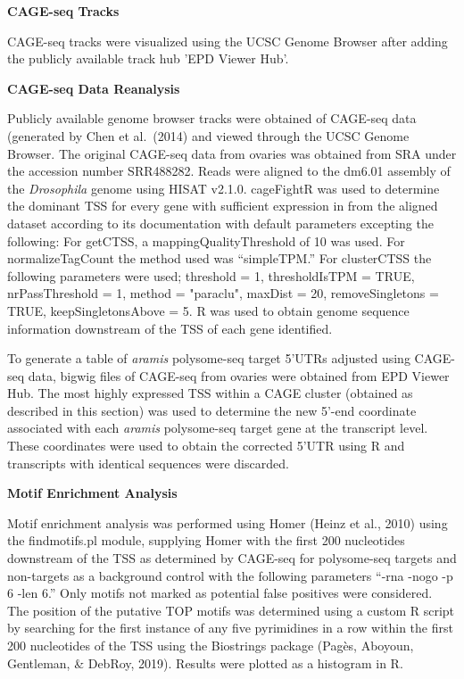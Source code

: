 \documentclass[12pt,oneside]{reedthesis}
\begin{document}
\textbf{CAGE-seq Tracks}

CAGE-seq tracks were visualized using the UCSC Genome Browser after
adding the publicly available track hub 'EPD Viewer Hub'.

\textbf{CAGE-seq Data Reanalysis}

Publicly available genome browser tracks were obtained of CAGE-seq data
(generated by Chen et al.~(2014) and viewed through the UCSC Genome
Browser. The original CAGE-seq data from ovaries was obtained from SRA
under the accession number SRR488282. Reads were aligned to the dm6.01
assembly of the \emph{Drosophila} genome using HISAT v2.1.0. cageFightR was
used to determine the dominant TSS for every gene with sufficient
expression in from the aligned dataset according to its documentation
with default parameters excepting the following: For getCTSS, a
mappingQualityThreshold of 10 was used. For normalizeTagCount the method
used was ``simpleTPM.'' For clusterCTSS the following parameters were
used; threshold = 1, thresholdIsTPM = TRUE, nrPassThreshold = 1, method
= "paraclu", maxDist = 20, removeSingletons = TRUE,
keepSingletonsAbove = 5. R was used to obtain genome sequence
information downstream of the TSS of each gene identified.

To generate a table of \emph{aramis} polysome-seq target 5'UTRs adjusted
using CAGE-seq data, bigwig files of CAGE-seq from ovaries were obtained
from EPD Viewer Hub. The most highly expressed TSS within a CAGE cluster
(obtained as described in this section) was used to determine the new
5'-end coordinate associated with each \emph{aramis} polysome-seq target gene
at the transcript level. These coordinates were used to obtain the
corrected 5'UTR using R and transcripts with identical sequences were
discarded.

\textbf{Motif Enrichment Analysis}

Motif enrichment analysis was performed using Homer
(Heinz et al., 2010) using the
findmotifs.pl module, supplying Homer with the first 200 nucleotides
downstream of the TSS as determined by CAGE-seq for polysome-seq targets
and non-targets as a background control with the following parameters
``-rna -nogo -p 6 -len 6.'' Only motifs not marked as potential false
positives were considered. The position of the putative TOP motifs was
determined using a custom R script by searching for the first instance
of any five pyrimidines in a row within the first 200 nucleotides of the
TSS using the Biostrings package
(Pagès, Aboyoun, Gentleman, \& DebRoy, 2019). Results were plotted as
a histogram in R.
\end{document}
